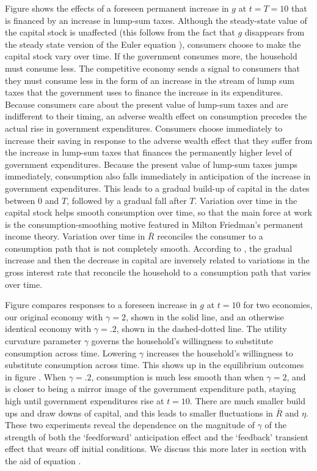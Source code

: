 \medskip
{} Figure 
shows the effects of a foreseen permanent increase in $g$ at
$t=T=10$ that is financed by an increase in lump-sum taxes.
Although the steady-state value of the capital stock is unaffected
(this follows from the fact that $g$ disappears from the steady
state version of the Euler equation ),  consumers choose to make the
capital stock
vary  over time.    If the
government consumes more, the household must consume less.  The competitive economy
sends a signal to consumers that they must consume less in the form of an increase in
the stream of lump sum taxes that the government uses to finance the increase in its expenditures.
 Because consumers care about the present value of
lump-sum taxes and are indifferent to their timing, an
adverse wealth effect on consumption precedes the actual rise in government
expenditures.  Consumers choose immediately  to increase their
saving in response to
the adverse wealth effect that they suffer
from the increase in lump-sum taxes that finances the
permanently higher level of government expenditures. Because the present value of lump-sum
taxes jumps immediately, consumption also falls immediately in anticipation of the increase in government
expenditures. This leads to a gradual build-up of capital in the
dates between $0$ and $T$, followed by a gradual fall after $T$.
Variation over time in the capital stock helps smooth
consumption over time, so that the main force at work is  the consumption-smoothing motive featured
in Milton Friedman's permanent income theory. Variation over time
in  $\bar R$ reconciles the consumer to a consumption
path that is not completely smooth.   According to
, the gradual increase and then the decrease in
capital are inversely related to variations in the
gross interest rate that reconcile the household to a consumption path that varies over time.

Figure  compares responses to a foreseen increase in $g$ at $t=10$ for two economies,
our original economy with $\gamma=2$, shown in the solid line,  and an otherwise identical economy with $\gamma=.2$,
shown in the dashed-dotted line.  The utility curvature parameter $\gamma$ governs the household's willingness to substitute
consumption across time. Lowering $\gamma$  increases the household's willingness to substitute consumption across time.
This shows up in the equilibrium  outcomes
 in figure . When $\gamma=.2$, consumption is much less smooth than when $\gamma=2$, and  is closer to being
a mirror image of the government expenditure path, staying high until government expenditures rise at $t=10$. There are  much smaller build ups and draw downs of capital,
and this leads to smaller fluctuations in $\bar R$ and $\eta$.  These two experiments reveal the   dependence  
on the magnitude of $\gamma$
of the strength of both the `feedforward' anticipation effect
and the `feedback' transient effect that wears off initial conditions.  We discuss this more later in section  with the aid of equation .


